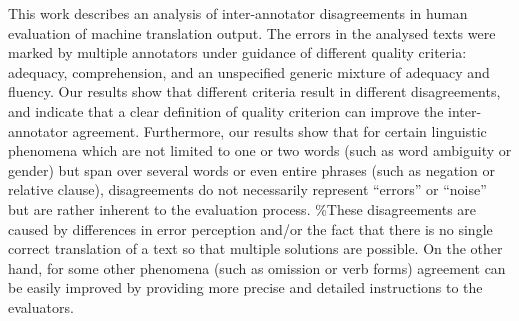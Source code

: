 This work describes  an analysis of inter-annotator disagreements in human evaluation of machine translation output. The errors in the analysed texts were marked by multiple annotators under guidance of different quality criteria: adequacy, comprehension, and an unspecified generic mixture of adequacy and fluency. Our results show that different criteria result in different disagreements, and indicate that a clear definition of quality criterion can improve the inter-annotator agreement. Furthermore, our results show that for certain linguistic phenomena which are not limited to one or two words (such as word ambiguity or gender) but span over several words or even entire phrases (such as negation or relative clause), disagreements do not necessarily represent ``errors'' or ``noise'' but are rather inherent to the evaluation process. \%These disagreements are caused by differences in error perception and/or the fact that there is no single correct  translation of a text so that multiple solutions are possible. On the other hand, for some other phenomena (such as omission or verb forms) agreement can be easily improved by providing more precise and detailed instructions to the evaluators.
